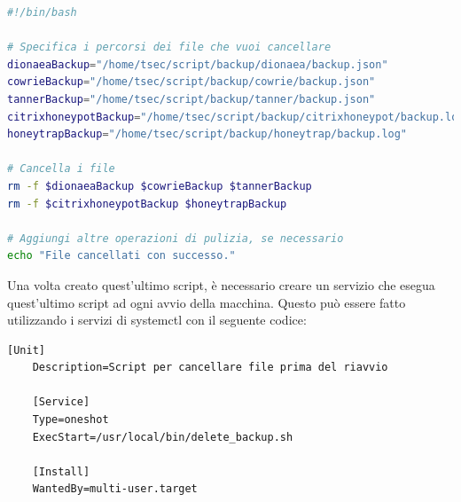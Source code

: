 \begin{lstlisting}[language=bash,caption={Delete\_Script.sh}]
#!/bin/bash

# Specifica i percorsi dei file che vuoi cancellare
dionaeaBackup="/home/tsec/script/backup/dionaea/backup.json"
cowrieBackup="/home/tsec/script/backup/cowrie/backup.json"
tannerBackup="/home/tsec/script/backup/tanner/backup.json"
citrixhoneypotBackup="/home/tsec/script/backup/citrixhoneypot/backup.log"
honeytrapBackup="/home/tsec/script/backup/honeytrap/backup.log"

# Cancella i file
rm -f $dionaeaBackup $cowrieBackup $tannerBackup
rm -f $citrixhoneypotBackup $honeytrapBackup

# Aggiungi altre operazioni di pulizia, se necessario
echo "File cancellati con successo."
\end{lstlisting}
Una volta creato quest'ultimo script, è necessario creare un servizio che esegua quest'ultimo script ad ogni avvio della macchina. Questo può essere fatto utilizzando i servizi di systemctl con il seguente codice:
\begin{lstlisting}[caption={Delete\_Backup.service}]
	[Unit]
	Description=Script per cancellare file prima del riavvio
	
	[Service]
	Type=oneshot
	ExecStart=/usr/local/bin/delete_backup.sh
	
	[Install]
	WantedBy=multi-user.target
\end{lstlisting}

